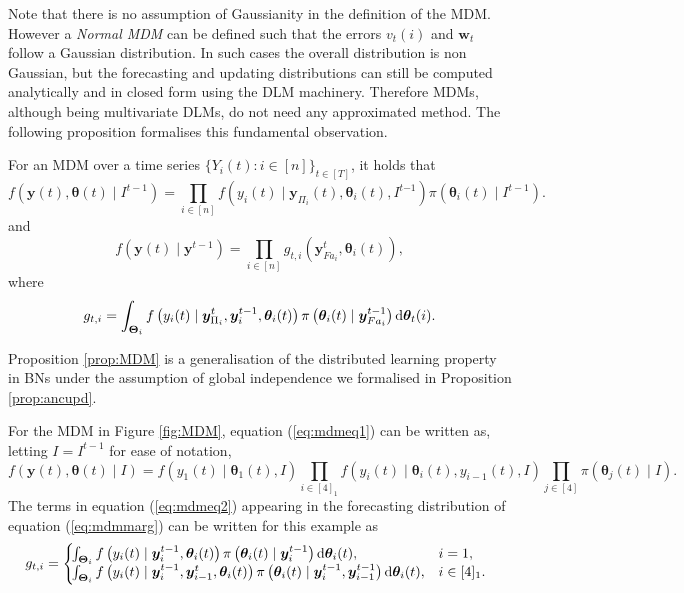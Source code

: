 Note that there is no assumption of Gaussianity in the definition of the MDM. However a \textit{Normal MDM} can be defined such that the errors $v_t(i)$ and $\bm{w}_t$ follow a Gaussian distribution. In such cases the overall distribution is non Gaussian, but the forecasting and updating distributions can still be computed analytically and in closed form using the DLM machinery. Therefore MDMs, although being multivariate DLMs, do not need any approximated method. The following proposition formalises this fundamental observation.

\begin{proposition}
\label{prop:MDM2}
For an MDM over a time series $\{Y_i(t):i\in[n]\}_{t\in[T]}$, it holds that 
\begin{equation}
\label{eq:mdmeq1}
f(\bm{y}(t),\bm{\theta}(t)\;|\; I^{t-1})=\prod_{i\in[n]}f(y_i(t)\;|\;\bm{y}_{\Pi_i}(t),\bm{\theta}_i(t), I^{t{-1}})\pi(\bm{\theta}_i(t)\;|\;I^{t-1}).
\end{equation}
and 
\begin{equation}
 \label{eq:mdmmarg}
 f\left(\bm{y}(t)\;|\;\bm{y}^{t-1}\right)=\prod_{i\in[n]} g_{t,i}\left(\bm{y}^t_{Fa_i},\bm{\theta}_i(t)\right),
 \end{equation}
where
\begin{equation}
g_{t,i}=\int_{\bm{\Theta}_i}f\left(y_i(t)\;|\;\bm{y}^{t}_{\Pi_i},\bm{y}^{t-1}_i,\bm{\theta}_i(t)\right)\pi\left(\bm{\theta}_i(t)\;|\;\bm{y}^{t-1}_{Fa_i}\right)\textnormal{d} \bm{\theta}_t(i).
\label{eq:mdmeq2}
\end{equation}
\end{proposition}
 Proposition \ref{prop:MDM} is a generalisation of the distributed learning property in BNs under the assumption of global independence we formalised in Proposition \ref{prop:ancupd}.
\begin{example}
For the MDM in Figure \ref{fig:MDM}, equation (\ref{eq:mdmeq1}) can be written as, letting $I=I^{t-1}$ for ease of notation,
\begin{equation*}
\label{eq:factorizationMDMexample}
f(\bm{y}(t),\bm{\theta}(t)\;|\; I)=f(y_1(t)\;|\;\bm{\theta}_1(t),I)\prod_{i\in[4]_1}f(y_i(t)\;|\;\bm{\theta}_i(t),y_{i-1}(t),I)\prod_{j\in[4]}\pi(\bm{\theta}_j(t)\;|\;I).
\end{equation*}
The terms in equation (\ref{eq:mdmeq2}) appearing in the forecasting distribution of equation (\ref{eq:mdmmarg}) can be written for this example as
\begin{equation*}
g_{t,i}= 
\left\{
\begin{array}{ll}
\!\!\!\!\int_{\bm{\Theta}_i}f\left(y_i(t)\;|\; \bm{y}^{t-1}_i,\bm{\theta}_i(t)\right)\pi\left(\bm{\theta}_i(t)\;|\; \bm{y}^{t-1}_i\right)\dr \bm{\theta}_i(t), & i=1,\\
\!\!\!\!\int_{\bm{\Theta}_i}f\left(y_i(t)\;|\; \bm{y}^{t-1}_i,\bm{y}^t_{i-1},\bm{\theta}_i(t)\right)\pi\left(\bm{\theta}_i(t)\;|\; \bm{y}^{t-1}_i,\bm{y}^{t-1}_{i-1}\right)\dr \bm{\theta}_i(t), & i\in[4]_1.
\end{array}
\right.
\label{eq:exampleMDMpredictive}
\end{equation*}
\end{example}

